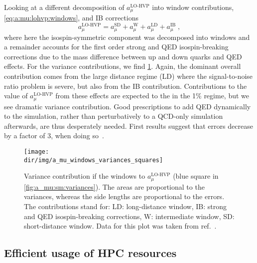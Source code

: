 Looking at a different decomposition of $a_{\mu}^{\text{LO-HVP}}$ into window contributions, \cref{eq:a:mu:lohvp:windows}, and IB corrections
\begin{equation}
a_{\mu}^{\text{LO-HVP}} = a_{\mu}^{\text{SD}} + a_{\mu}^{\text{W}} + a_{\mu}^{\text{LD}} + a_{\mu}^{\text{IB}} \;,
\end{equation}
where here the isospin-symmetric component was decomposed into windows and a remainder accounts for the first order strong and QED isospin-breaking corrections due to the mass difference between up and down quarks and QED effects.
For the variance contributions, we find \cref{fig:a_mu:windows:variances}.
Again, the dominant overall contribution comes from the large distance regime (LD) where the signal-to-noise ratio problem is severe, but also from the IB contribution.
Contributions to the value of $a_{\mu}^{\text{LO-HVP}}$ from these effects are expected to the in the 1\% regime, but we see dramatic variance contribution.
Good prescriptions to add QED dynamically to the simulation, rather than perturbatively to a QCD-only simulation afterwards, are thus desperately needed.
First results suggest that errors decrease by a factor of \num{3}, when doing so~.

\begin{figure}
\centering
\texttt{[image: \\dir/img/a\_mu\_windows\_variances\_squares]}
\caption{
Variance contribution if the windows to $a_{\mu}^{\text{LO-HVP}}$ (blue square in \cref{fig:a_mu:sm:variances}).
The areas are proportional to the variances, whereas the side lengths are proportional to the errors.
The contributions stand for: LD: long-distance window, IB: strong and QED isospin-breaking corrections, W: intermediate window, SD: short-distance window.
Data for this plot was taken from ref.~\cite{snowmass:2025}.
}
\label{fig:a_mu:windows:variances}
\end{figure}

\subsection{Efficient usage of HPC resources}

